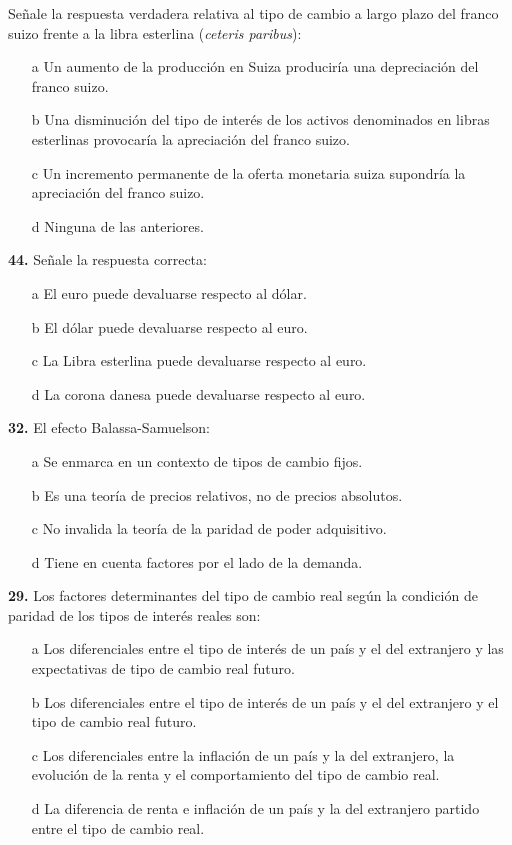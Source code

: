 \documentclass{nuevotema}
\begin{document}
Señale la respuesta verdadera relativa al tipo de cambio a largo plazo del franco suizo frente a la libra esterlina (\textit{ceteris paribus}):
\begin{enumerate}
	\item[a] Un aumento de la producción en Suiza produciría una depreciación del franco suizo.
	\item[b] Una disminución del tipo de interés de los activos denominados en libras esterlinas provocaría la apreciación del franco suizo.
	\item[c] Un incremento permanente de la oferta monetaria suiza supondría la apreciación del franco suizo.
	\item[d] Ninguna de las anteriores.
\end{enumerate}


\textbf{44.} Señale la respuesta correcta:
\begin{enumerate}
	\item[a] El euro puede devaluarse respecto al dólar.
	\item[b] El dólar puede devaluarse respecto al euro.
	\item[c] La Libra esterlina puede devaluarse respecto al euro.
	\item[d] La corona danesa puede devaluarse respecto al euro.
\end{enumerate}

\textbf{32.} El efecto Balassa-Samuelson:
\begin{itemize}
	\item[a] Se enmarca en un contexto de tipos de cambio fijos.
	\item[b] Es una teoría de precios relativos, no de precios absolutos.
	\item[c] No invalida la teoría de la paridad de poder adquisitivo.
	\item[d] Tiene en cuenta factores por el lado de la demanda.
\end{itemize}


\textbf{29.}  Los factores determinantes del tipo de cambio real según la condición de paridad de los tipos de interés reales son:
\begin{enumerate}
	\item[a] Los diferenciales entre el tipo de interés de un país y el del extranjero y las expectativas de tipo de cambio real futuro.
	\item[b] Los diferenciales entre el tipo de interés de un país y el del extranjero y el tipo de cambio real futuro.
	\item[c] Los diferenciales entre la inflación de un país y la del extranjero, la evolución de la renta y el comportamiento del tipo de cambio real.
	\item[d] La diferencia de renta e inflación de un país y la del extranjero partido entre el tipo de cambio real.
\end{enumerate}
\end{document}
